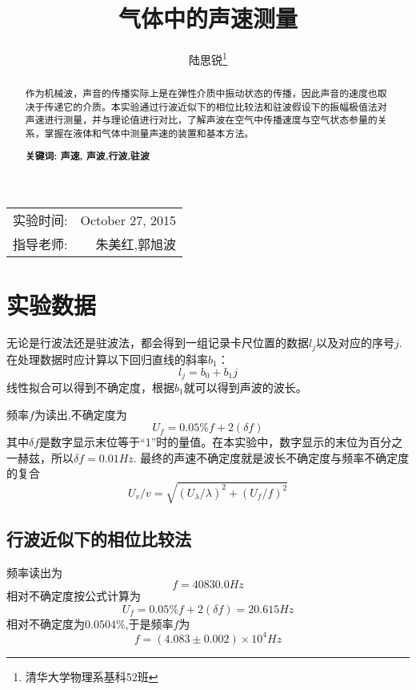 \documentclass[12pt,a4paper]{ctexart}
\begin{document}
\title{气体中的声速测量}
\author{陆思锐\thanks{清华大学物理系\quad 基科52班 } } 
\date{}
\maketitle
\begin{center}
\begin{tabular}{l r}
实验时间: & October 27, 2015 \\ 
指导老师: & 朱美红,郭旭波 %
\end{tabular}
\end{center}

\begin{abstract}
作为机械波，声音的传播实际上是在弹性介质中振动状态的传播，因此声音的速度也取决于传递它的介质。本实验通过行波近似下的相位比较法和驻波假设下的振幅极值法对声速进行测量，并与理论值进行对比，了解声波在空气中传播速度与空气状态参量的关系，掌握在液体和气体中测量声速的装置和基本方法。


\textbf{关键词: 声速, 声波,行波,驻波}
\end{abstract}
\clearpage
\section{实验数据}
无论是行波法还是驻波法，都会得到一组记录卡尺位置的数据$l_j$以及对应的序号$j$.在处理数据时应计算以下回归直线的斜率$b_1$：
$$l_j = b_0 + b_1j$$
线性拟合可以得到不确定度，根据$b_1$就可以得到声波的波长。

频率$f$为读出,不确定度为
$$U_f = 0.05\%f + 2(\delta f )$$
其中$\delta f$是数字显示末位等于“1”时的量值。在本实验中，数字显示的末位为百分之一赫兹，所以$\delta f =0.01Hz$.
最终的声速不确定度就是波长不确定度与频率不确定度的复合
$$U_v/v = \sqrt{(U_{\lambda}/\lambda)^2 +(U_f/f)^2}$$

\subsection{行波近似下的相位比较法}
频率读出为
$$f=40830.0Hz$$
相对不确定度按公式计算为
$$U_f = 0.05\%f + 2(\delta f )=20.615Hz$$
相对不确定度为$0.0504\%$,于是频率$f$为
$$f=(4.083\pm0.002)\times 10^4 Hz$$
\begin{table}[htbp]
  \centering
  \caption{行波近似下的相位比较法}
  \label{tab:addlabel}%
\end{table}%
\end{document}

